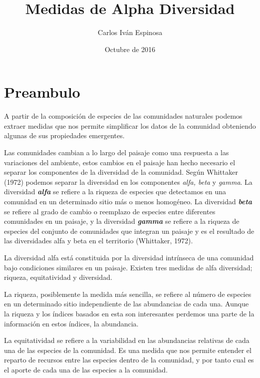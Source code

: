 \documentclass[]{book}
\title{Medidas de Alpha Diversidad}
\author{Carlos Iván Espinosa}
\date{Octubre de 2016}
\begin{document}
\maketitle

{
\setcounter{tocdepth}{1}
\tableofcontents
}
\chapter*{Preambulo}\label{preambulo}

A partir de la composición de especies de las comunidades naturales
podemos extraer medidas que nos permite simplificar los datos de la
comunidad obteniendo algunas de sus propiedades emergentes.

Las comunidades cambian a lo largo del paisaje como una respuesta a las
variaciones del ambiente, estos cambios en el paisaje han hecho
necesario el separar los componentes de la diversidad de la comunidad.
Según Whittaker (1972) podemos separar la diversidad en los componentes
\emph{alfa, beta} y \emph{gamma}. La diversidad \emph{\textbf{alfa}} se
refiere a la riqueza de especies que detectamos en una comunidad en un
determinado sitio más o menos homogéneo. La diversidad
\emph{\textbf{beta}} se refiere al grado de cambio o reemplazo de
especies entre diferentes comunidades en un paisaje, y la diversidad
\emph{\textbf{gamma}} se refiere a la riqueza de especies del conjunto
de comunidades que integran un paisaje y es el resultado de las
diversidades alfa y beta en el territorio (Whittaker, 1972).


La diversidad alfa está constituida por la diversidad intrínseca de una
comunidad bajo condiciones similares en un paisaje. Existen tres medidas
de alfa diversidad; riqueza, equitatividad y diversidad.

La riqueza, posiblemente la medida más sencilla, se refiere al número de
especies en un determinado sitio independiente de las abundancias de
cada una. Aunque la riqueza y los índices basados en esta son
interesantes perdemos una parte de la información en estos índices, la
abundancia.

La equitatividad se refiere a la variabilidad en las abundancias
relativas de cada una de las especies de la comunidad. Es una medida que
nos permite entender el reparto de recursos entre las especies dentro de
la comunidad, y por tanto cual es el aporte de cada una de las especies
a la comunidad.
\end{document}
